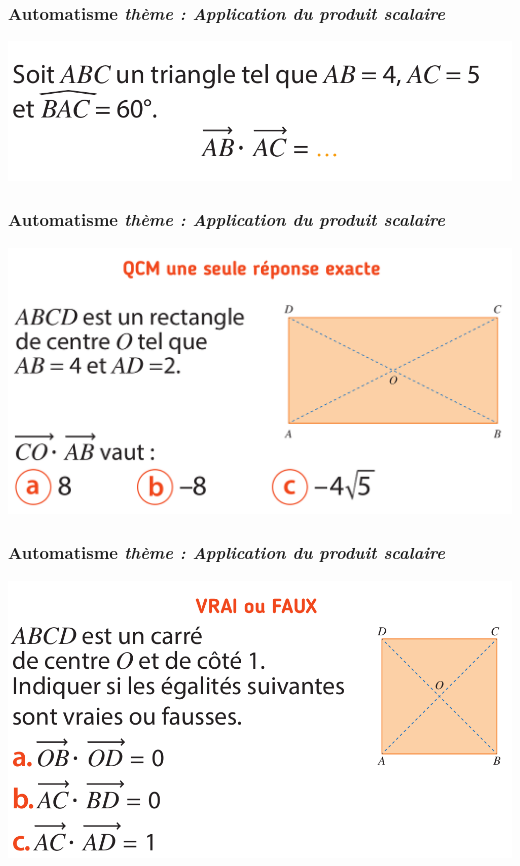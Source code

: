 \documentclass[11pt]{beamer}
\newcounter{autocompteur}
\newcommand{\automatisme}[1]{\addtocounter{autocompteur}{1}\frametitle{Automatisme  \theautocompteur  \textit{ thème : #1}}}
\begin{document}
\begin{frame}
\automatisme{Application du produit scalaire}

\begin{center}
\includegraphics[scale=0.3]{ressources/prodscal-3.png}
\end{center}


\end{frame}


\begin{frame}
\automatisme{Application du produit scalaire}

\begin{center}
\includegraphics[scale=0.3]{ressources/prodscal-4.png}
\end{center}


\end{frame}


\begin{frame}
\automatisme{Application du produit scalaire}

\begin{center}
\includegraphics[scale=0.3]{ressources/prodscal-5.png}
\end{center}


\end{frame}
\end{document}
